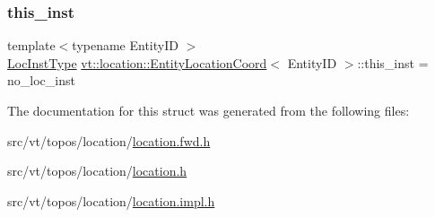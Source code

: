 \mbox{\label{structvt_1_1location_1_1_entity_location_coord_ade191f7cf6aba682f960abef1ddab9fc}} 
\subsubsection{\texorpdfstring{this\+\_\+inst}{this\_inst}}
{\footnotesize\ttfamily template$<$typename Entity\+ID $>$ \\
\hyperlink{namespacevt_1_1location_a4db6456e8024af2d23fc5ae560fef866}{Loc\+Inst\+Type} \hyperlink{structvt_1_1location_1_1_entity_location_coord}{vt\+::location\+::\+Entity\+Location\+Coord}$<$ Entity\+ID $>$\+::this\+\_\+inst = no\+\_\+loc\+\_\+inst\hspace{0.3cm}{\ttfamily [private]}}



The documentation for this struct was generated from the following files\+:\begin{DoxyCompactItemize}
\item 
src/vt/topos/location/\hyperlink{location_8fwd_8h}{location.\+fwd.\+h}\item 
src/vt/topos/location/\hyperlink{location_8h}{location.\+h}\item 
src/vt/topos/location/\hyperlink{location_8impl_8h}{location.\+impl.\+h}\end{DoxyCompactItemize}
